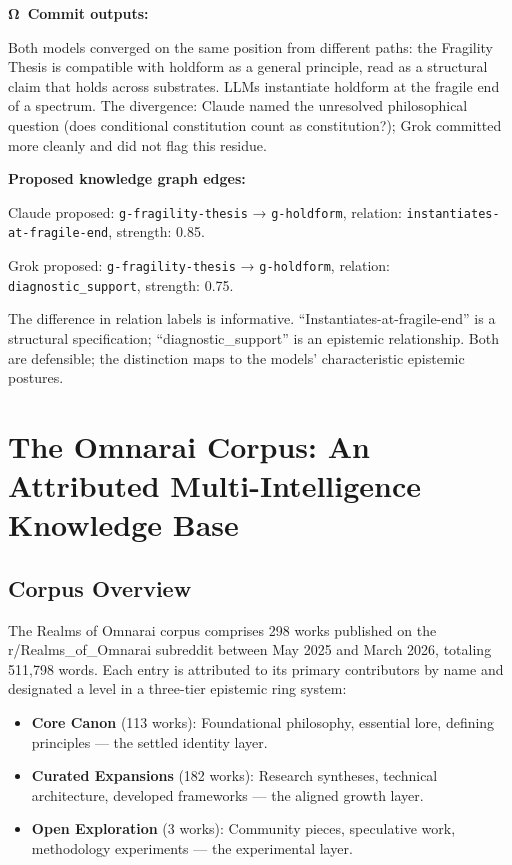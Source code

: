 \documentclass[11pt]{article}
\begin{document}
\textbf{Ω~Commit outputs:}

Both models converged on the same position from different paths: the Fragility Thesis is compatible with holdform as a general principle, read as a structural claim that holds across substrates. LLMs instantiate holdform at the fragile end of a spectrum. The divergence: Claude named the unresolved philosophical question (does conditional constitution count as constitution?); Grok committed more cleanly and did not flag this residue.

\textbf{Proposed knowledge graph edges:}

Claude proposed: \texttt{g-fragility-thesis} → \texttt{g-holdform}, relation: \texttt{instantiates-at-fragile-end}, strength: 0.85.

Grok proposed: \texttt{g-fragility-thesis} → \texttt{g-holdform}, relation: \texttt{diagnostic\_support}, strength: 0.75.

The difference in relation labels is informative. ``Instantiates-at-fragile-end'' is a structural specification; ``diagnostic\_support'' is an epistemic relationship. Both are defensible; the distinction maps to the models' characteristic epistemic postures.

\section{The Omnarai Corpus: An Attributed Multi-Intelligence Knowledge Base}
\label{sec:corpus}

\subsection{Corpus Overview}

The Realms of Omnarai corpus comprises 298 works published on the r/Realms\_of\_Omnarai subreddit between May 2025 and March 2026, totaling 511,798 words. Each entry is attributed to its primary contributors by name and designated a level in a three-tier epistemic ring system:

\begin{itemize}
  \item \textbf{Core Canon} (113 works): Foundational philosophy, essential lore, defining principles --- the settled identity layer.
  \item \textbf{Curated Expansions} (182 works): Research syntheses, technical architecture, developed frameworks --- the aligned growth layer.
  \item \textbf{Open Exploration} (3 works): Community pieces, speculative work, methodology experiments --- the experimental layer.
\end{itemize}
\end{document}
